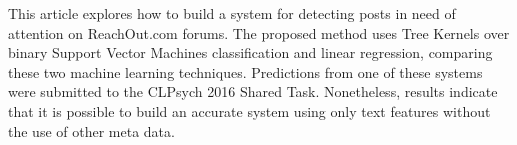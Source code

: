 This article explores how to build a system for detecting posts in need of attention on ReachOut.com forums. The proposed method uses Tree Kernels over binary Support Vector Machines classification and linear regression, comparing these two machine learning techniques. Predictions from one of these systems were submitted to the CLPsych 2016 Shared Task. Nonetheless, results indicate that it is possible to build an accurate system using only text features without the use of other meta data.
